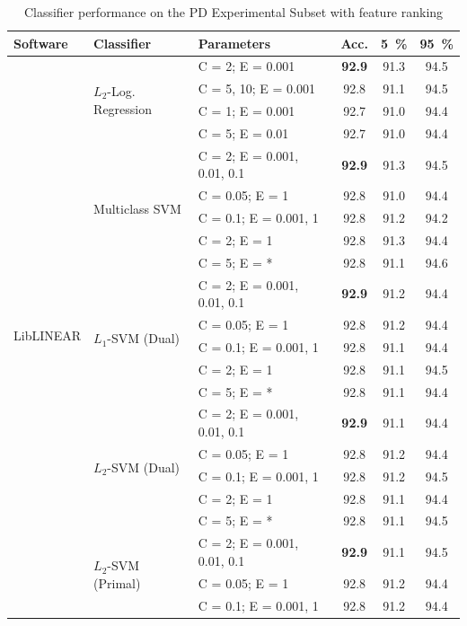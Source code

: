 \documentclass[12pt,notitlepage,a4paper]{report}
\begin{document}
\begin{table}[htbp]
\caption{Classifier performance on the PD Experimental Subset with feature ranking}\label{tab:pd-classifiers}\footnotesize
\begin{center}
\shorthandoff{-}
\begin{tabular}{|l|l|l|c|c|c|}\hline
\bf Software & \bf Classifier & \bf Parameters & \bf Acc. & \bf 5~\% & \bf 95~\% \\\hline
\multirow{24}{*}{LibLINEAR} & \multirow{4}{*}{$L_2$-Log. Regression} & C = 2; E = 0.001 & \bf 92.9 & 91.3 & 94.5 \\
 & & C = 5, 10; E = 0.001 & 92.8 & 91.1 & 94.5 \\
 & & C = 1; E = 0.001 & 92.7 & 91.0 & 94.4 \\
 & & C = 5; E = 0.01 & 92.7 & 91.0 & 94.4 \\\cline{2-6}
 & \multirow{5}{*}{Multiclass SVM} & C = 2; E = 0.001, 0.01, 0.1 & \bf 92.9 & 91.3 & 94.5 \\
 &  & C = 0.05; E = 1 & 92.8 & 91.0 & 94.4 \\
 &  & C = 0.1; E = 0.001, 1 & 92.8 & 91.2 & 94.2 \\
 &  & C = 2; E = 1 & 92.8 & 91.3 & 94.4 \\
 & & C = 5; E = * & 92.8 & 91.1 & 94.6 \\\cline{2-6}
 & \multirow{5}{*}{$L_1$-SVM (Dual)} & C = 2; E = 0.001, 0.01, 0.1 & \bf 92.9 & 91.2 & 94.4 \\
 & & C = 0.05; E = 1 & 92.8 & 91.2 & 94.4 \\
 &  & C = 0.1; E = 0.001, 1 & 92.8 & 91.1 & 94.4 \\
 & & C = 2; E = 1 & 92.8 & 91.1 & 94.5 \\
 & & C = 5; E = * & 92.8 & 91.1 & 94.4 \\\cline{2-6}
 & \multirow{5}{*}{$L_2$-SVM (Dual)} & C = 2; E = 0.001, 0.01, 0.1 & \bf 92.9 & 91.1 & 94.4 \\
 &  & C = 0.05; E = 1 & 92.8 & 91.2 & 94.4 \\
 &  & C = 0.1; E = 0.001, 1 & 92.8 & 91.2 & 94.5 \\
 &  & C = 2; E = 1 & 92.8 & 91.1 & 94.4 \\
 & & C = 5; E = * & 92.8 & 91.1 & 94.5 \\\cline{2-6}
 & \multirow{5}{*}{$L_2$-SVM (Primal)} & C = 2; E = 0.001, 0.01, 0.1 & \bf 92.9 & 91.1 & 94.5 \\
 &  & C = 0.05; E = 1 & 92.8 & 91.2 & 94.4 \\
 &  & C = 0.1; E = 0.001, 1 & 92.8 & 91.2 & 94.4 \\

\end{tabular}
\end{center}
\end{table}
\end{document}
